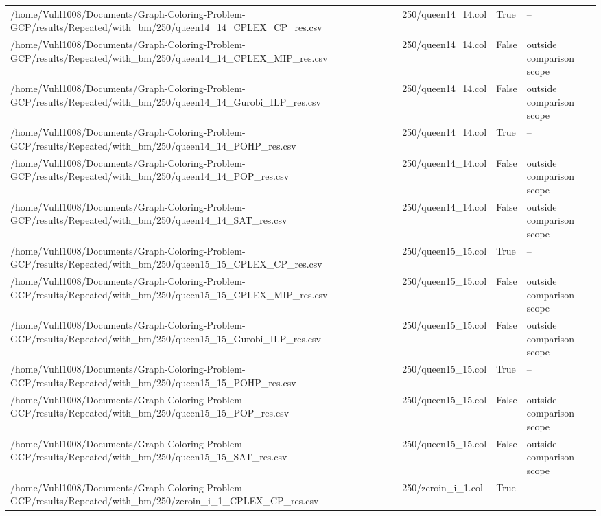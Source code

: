 \begin{table}[htbp]
\begin{tabular}{llll}
/home/Vuhl1008/Documents/Graph-Coloring-Problem-GCP/results/Repeated/with\_bm/250/queen14\_14\_CPLEX\_CP\_res.csv & 250/queen14\_14.col & True & -- \\
/home/Vuhl1008/Documents/Graph-Coloring-Problem-GCP/results/Repeated/with\_bm/250/queen14\_14\_CPLEX\_MIP\_res.csv & 250/queen14\_14.col & False & outside comparison scope \\
/home/Vuhl1008/Documents/Graph-Coloring-Problem-GCP/results/Repeated/with\_bm/250/queen14\_14\_Gurobi\_ILP\_res.csv & 250/queen14\_14.col & False & outside comparison scope \\
/home/Vuhl1008/Documents/Graph-Coloring-Problem-GCP/results/Repeated/with\_bm/250/queen14\_14\_POHP\_res.csv & 250/queen14\_14.col & True & -- \\
/home/Vuhl1008/Documents/Graph-Coloring-Problem-GCP/results/Repeated/with\_bm/250/queen14\_14\_POP\_res.csv & 250/queen14\_14.col & False & outside comparison scope \\
/home/Vuhl1008/Documents/Graph-Coloring-Problem-GCP/results/Repeated/with\_bm/250/queen14\_14\_SAT\_res.csv & 250/queen14\_14.col & False & outside comparison scope \\
/home/Vuhl1008/Documents/Graph-Coloring-Problem-GCP/results/Repeated/with\_bm/250/queen15\_15\_CPLEX\_CP\_res.csv & 250/queen15\_15.col & True & -- \\
/home/Vuhl1008/Documents/Graph-Coloring-Problem-GCP/results/Repeated/with\_bm/250/queen15\_15\_CPLEX\_MIP\_res.csv & 250/queen15\_15.col & False & outside comparison scope \\
/home/Vuhl1008/Documents/Graph-Coloring-Problem-GCP/results/Repeated/with\_bm/250/queen15\_15\_Gurobi\_ILP\_res.csv & 250/queen15\_15.col & False & outside comparison scope \\
/home/Vuhl1008/Documents/Graph-Coloring-Problem-GCP/results/Repeated/with\_bm/250/queen15\_15\_POHP\_res.csv & 250/queen15\_15.col & True & -- \\
/home/Vuhl1008/Documents/Graph-Coloring-Problem-GCP/results/Repeated/with\_bm/250/queen15\_15\_POP\_res.csv & 250/queen15\_15.col & False & outside comparison scope \\
/home/Vuhl1008/Documents/Graph-Coloring-Problem-GCP/results/Repeated/with\_bm/250/queen15\_15\_SAT\_res.csv & 250/queen15\_15.col & False & outside comparison scope \\
/home/Vuhl1008/Documents/Graph-Coloring-Problem-GCP/results/Repeated/with\_bm/250/zeroin\_i\_1\_CPLEX\_CP\_res.csv & 250/zeroin\_i\_1.col & True & -- \\

\end{tabular}
\end{table}
